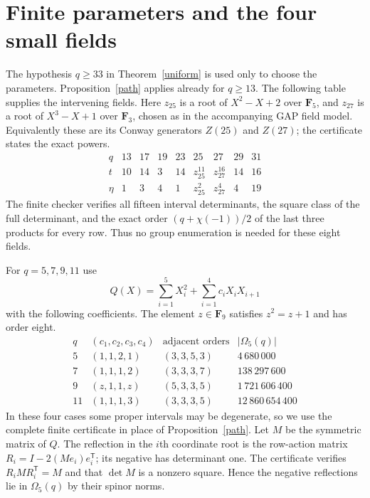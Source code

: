 \documentclass[11pt,a4paper]{article}
\newcommand{\F}{\mathbf F}
\newcommand{\Om}{\Omega}
\begin{document}
\section{Finite parameters and the four small fields}
The hypothesis $q\ge33$ in Theorem~\ref{uniform} is used only
to choose the parameters. Proposition~\ref{path} applies already
for $q\ge13$. The following table supplies the intervening fields.
Here $z_{25}$ is a root of $X^2-X+2$ over $\F_5$, and $z_{27}$
is a root of $X^3-X+1$ over $\F_3$, chosen as in the accompanying
GAP field model. Equivalently these are its Conway generators
$Z(25)$ and $Z(27)$; the certificate states the exact powers.
\[
\begin{array}{c|rrrrrrrr}
 q&13&17&19&23&25&27&29&31\\\hline
 t&10&14&3&14&z_{25}^{11}&z_{27}^{16}&14&16\\
 \eta&1&3&4&1&z_{25}^{2}&z_{27}^{4}&4&19
\end{array}                                                    \tag{5}
\]
The finite checker verifies all fifteen interval determinants,
the square class of the full determinant, and the exact order
$(q+\chi(-1))/2$ of the last three products for every row.
Thus no group enumeration is needed for these eight fields.

For $q=5,7,9,11$ use
\[
 Q(X)=\sum_{i=1}^5X_i^2+\sum_{i=1}^4c_iX_iX_{i+1}
\]
with the following coefficients. The element $z\in\F_9$ satisfies
$z^2=z+1$ and has order eight.
\[
\begin{array}{c|c|c|r}
q&(c_1,c_2,c_3,c_4)&\text{adjacent orders}&|\Om_5(q)|\\\hline
5 &(1,1,2,1)&(3,3,5,3)&4\,680\,000\\
7 &(1,1,1,2)&(3,3,3,7)&138\,297\,600\\
9 &(z,1,1,z)&(5,3,3,5)&1\,721\,606\,400\\
11&(1,1,1,3)&(3,3,3,5)&12\,860\,654\,400
\end{array}                                                    \tag{6}
\]
In these four cases some proper intervals may be degenerate, so
we use the complete finite certificate in place of
Proposition~\ref{path}. Let $M$ be the symmetric matrix of $Q$.
The reflection in the $i$th coordinate root is the row-action
matrix $R_i=I-2(Me_i)e_i^{\mathsf T}$; its negative has
determinant one. The certificate verifies $R_iMR_i^{\mathsf T}=M$
and that $\det M$ is a nonzero square. Hence the negative
reflections lie in $\Om_5(q)$ by their spinor norms.
\end{document}
